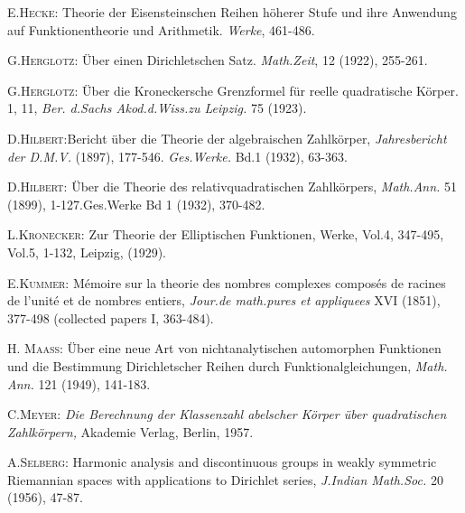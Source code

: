 \begin{thebibliography}{99}
 \textsc{E.\@ Hecke:} Theorie der Eisensteinschen Reihen
  h\"oherer Stufe und ihre Anwendung auf Funktionentheorie und
  Arithmetik. {\em Werke}, 461-486.

 \textsc{G.\@ Herglotz:} \"Uber einen Dirichletschen
  Satz. {\em Math.\@ Zeit}, 12 (1922), 255-261.

 \textsc{G.\@ Herglotz:} \"Uber die Kroneckersche
  Grenzformel f\"ur reelle quadratische K\"orper. 1, 11, {\em Ber.\@
    d.\@ Sachs Akod.\@ d.\@ Wiss.\@ zu Leipzig.} 75 (1923).

 \textsc{D.\@ Hilbert:}\pageoriginale Bericht \"uber die Theorie der
  algebraischen Zahlk\"orper, {\em Jahresbericht der D.M.V.} (1897),
  177-546. {\em Ges.\@ Werke.} Bd.\@ 1 (1932), 63-363.

 \textsc{D.\@ Hilbert:} \"Uber die Theorie des
  relativquadratischen Zahlk\"orpers, {\em Math.\@ Ann.} 51 (1899),
  1-127.\@ Ges.\@ Werke Bd 1 (1932), 370-482.

 \textsc{L.\@ Kronecker:} Zur Theorie der Elliptischen
  Funktionen, Werke, Vol.\@ 4, 347-495, Vol.\@ 5, 1-132, Leipzig, (1929).

 \textsc{E.\@ Kummer:} M\'emoire sur la theorie des
  nombres complexes compos\'es de racines de l'unit\'e et de nombres
  entiers, {\em Jour.\@ de math.\@ pures et appliquees} XVI (1851),
  377-498 (collected papers I, 363-484).

 \textsc{H. Maass:} \"Uber eine neue Art von
  nichtanalytischen automorphen Funktionen und die Bestimmung
  Dirichletscher Reihen durch Funktionalgleichungen, {\em Math.\@
    Ann.} 121 (1949), 141-183. 

 \textsc{C.\@ Meyer:} {\em Die Berechnung der Klassenzahl
  abelscher K\"orper \"uber quadratischen Zahlk\"orpern,} Akademie
  Verlag, Berlin, 1957.

 \textsc{A.\@ Selberg:} Harmonic analysis and
  discontinuous groups in weakly symmetric Riemannian spaces with
  applications to Dirichlet series, {\em J.\@ Indian Math.\@ Soc.} 20
  (1956), 47-87.

\end{thebibliography}

